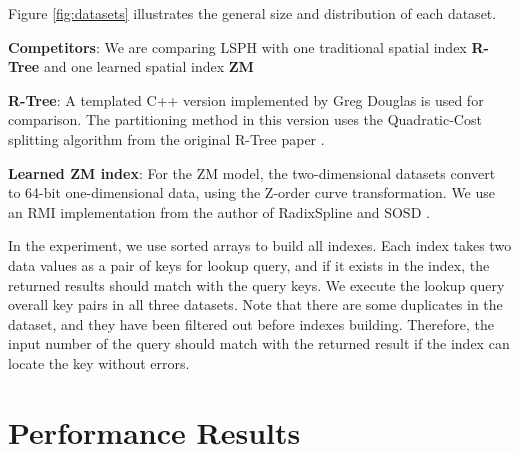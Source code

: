Figure \ref{fig:datasets} illustrates the general size and distribution of each dataset. 

\textbf{Competitors}:
We are comparing LSPH with one traditional spatial index \textbf{R-Tree} \cite{Guttman:1984ka} and one learned spatial index \textbf{ZM} \cite{Wang:2019ks}

\textbf{R-Tree}: A templated C++ version implemented by Greg Douglas \cite{rtreecplus} is used for comparison. The partitioning method in this version uses the Quadratic-Cost splitting algorithm from the original R-Tree paper \cite{Guttman:1984ka}. 

\textbf{Learned ZM index}:  For the ZM model, the two-dimensional datasets convert to 64-bit one-dimensional data, using the Z-order curve transformation. We use an RMI implementation from the author of RadixSpline and SOSD \cite{Kipf:2020wr}. 

In the experiment, we use sorted arrays to build all indexes. Each index takes two data values as a pair of keys for lookup query, and if it exists in the index, the returned results should match with the query keys. We execute the lookup query overall key pairs in all three datasets. Note that there are some duplicates in the dataset, and they have been filtered out before indexes building. Therefore, the input number of the query should match with the returned result if the index can locate the key without errors. 


\section{Performance Results}

